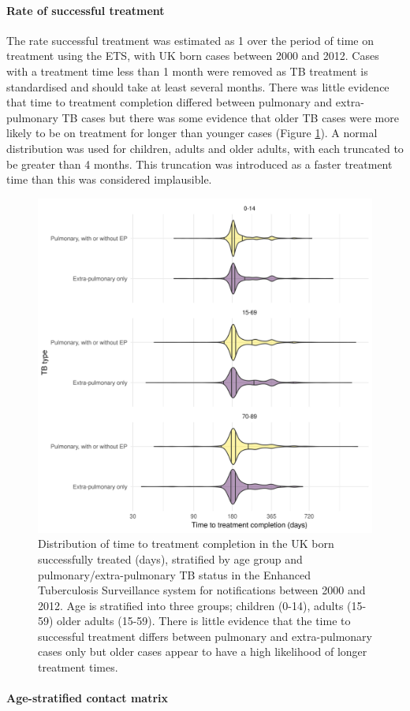 \documentclass[11pt,twoside]{bristolthesis}
\begin{document}
  \hypertarget{rate-of-successful-treatment}{%
  \paragraph{Rate of successful treatment}\label{rate-of-successful-treatment}}
  
  The rate successful treatment was estimated as 1 over the period of time on treatment using the ETS, with UK born cases between 2000 and 2012. Cases with a treatment time less than 1 month were removed as TB treatment is standardised and should take at least several months. There was little evidence that time to treatment completion differed between pulmonary and extra-pulmonary TB cases but there was some evidence that older TB cases were more likely to be on treatment for longer than younger cases (Figure \ref{fig:tb-treat-time-succ}). A normal distribution was used for children, adults and older adults, with each truncated to be greater than 4 months. This truncation was introduced as a faster treatment time than this was considered implausible.
  \begin{figure}
  
  {\centering \includegraphics[width=0.8\linewidth]{chapters/model-development/resources/figure/time_cure} 
  
  }
  
  \caption{Distribution of time to treatment completion in the UK born successfully treated (days), stratified by age group and pulmonary/extra-pulmonary TB status in the Enhanced Tuberculosis Surveillance system for notifications between 2000 and 2012. Age is stratified into three groups; children (0-14), adults (15-59) older adults (15-59). There is little evidence that the time to successful treatment differs between pulmonary and extra-pulmonary cases only but older cases appear to have a high likelihood of longer treatment times.}\label{fig:tb-treat-time-succ}
  \end{figure}
  \hypertarget{contact-matrix}{%
  \paragraph{Age-stratified contact matrix}\label{contact-matrix}}
  
\end{document}
